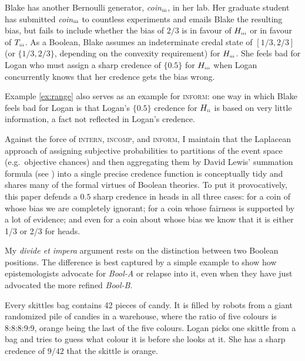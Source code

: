 \documentclass[11pt]{article}
\newcommand{\anderson}[0]{\textit{Bool-A}}
\newcommand{\augustin}[0]{\textit{Bool-B}}
\begin{document}
\begin{quotex}
  \label{ex:incomp} Blake has another Bernoulli
  generator, \textit{coin}$_{\mbox{\tiny{iii}}}$, in her lab. Her
  graduate student has submitted \textit{coin}$_{\mbox{\tiny{iii}}}$
  to countless experiments and emails Blake the resulting bias, but
  fails to include whether the bias of $2/3$ is in favour of
  $H_{\mbox{\tiny{iii}}}$ or in favour of $T_{\mbox{\tiny{iii}}}$. As
  a Boolean, Blake assumes an indeterminate credal state of
  $[1/3,2/3]$ (or $\{1/3,2/3\}$, depending on the convexity
  requirement) for $H_{\mbox{\tiny{iii}}}$. She feels bad for Logan
  who must assign a sharp credence of $\{0.5\}$ for
  $H_{\mbox{\tiny{iii}}}$ when Logan concurrently knows that her
  credence gets the bias wrong.
\end{quotex}

Example \ref{ex:range} also serves as an example for \textsc{inform}:
one way in which Blake feels bad for Logan is that Logan's $\{0.5\}$
credence for $H_{\mbox{\tiny{ii}}}$ is based on very little
information, a fact not reflected in Logan's credence. 

Against the force of \textsc{intern}, \textsc{incomp}, and
\textsc{inform}, I maintain that the Laplacean approach of assigning
subjective probabilities to partitions of the event space (e.g.\
objective chances) and then aggregating them by David Lewis' summation
formula (see \scite{8}{lewis81}{266f}) into a single precise credence
function is conceptually tidy and shares many of the formal virtues of
Boolean theories. To put it provocatively, this paper defends a $0.5$
sharp credence in heads in all three cases: for a coin of whose bias
we are completely ignorant; for a coin whose fairness is supported by
a lot of evidence; and even for a coin about whose bias we know that
it is either 1/3 or 2/3 for heads.

My \emph{divide et impera} argument rests on the distinction between
two Boolean positions. The difference is best captured by a simple
example to show how epistemologists advocate for {\anderson} or
relapse into it, even when they have just advocated the more refined
{\augustin}.

\begin{quotex}
  \label{ex:skittles} Every skittles bag contains
  42 pieces of candy. It is filled by robots from a giant randomized
  pile of candies in a warehouse, where the ratio of five colours is
  8:8:8:9:9, orange being the last of the five colours. Logan picks
  one skittle from a bag and tries to guess what colour it is before
  she looks at it. She has a sharp credence of $9/42$ that the skittle
  is orange.
\end{quotex}
\end{document}
